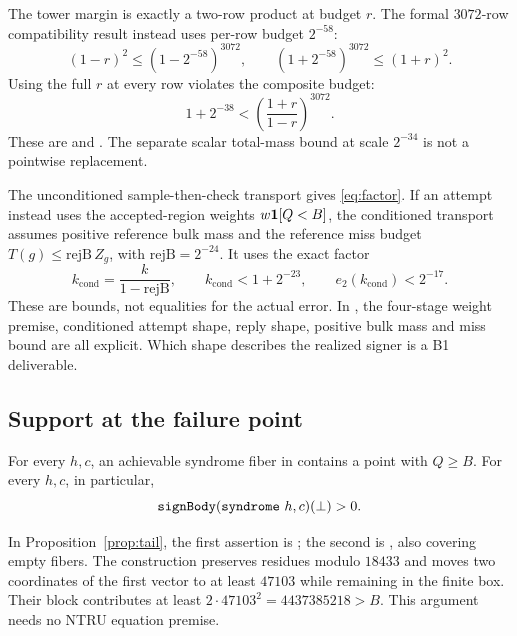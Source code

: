 The tower margin is exactly a two-row product at budget $r$. The formal
$3072$-row compatibility result instead uses per-row budget $2^{-58}$:
\[
 (1-r)^2\leq(1-2^{-58})^{3072},\qquad
 (1+2^{-58})^{3072}\leq(1+r)^2.
\]
Using the full $r$ at every row violates the composite budget:
\[
 1+2^{-38}<\left(\frac{1+r}{1-r}\right)^{3072}.
\]
These are  and
. The separate scalar total-mass bound
at scale $2^{-34}$ is not a pointwise replacement.

\begin{remark}\label{rmk:shape}
The unconditioned sample-then-check transport gives \eqref{eq:factor}.
If an attempt instead uses the accepted-region weights
$w\mathbf{1}[Q<B]$, the conditioned transport assumes positive reference
bulk mass and the reference miss budget
$T(g)\leq\mathrm{rejB}\,Z_g$, with $\mathrm{rejB}=2^{-24}$.
It uses the exact factor
\[
 k_{\mathrm{cond}}=\frac{k}{1-\mathrm{rejB}},\qquad
 k_{\mathrm{cond}}<1+2^{-23},\qquad e_2(k_{\mathrm{cond}})<2^{-17}.
\]
These are bounds, not equalities for the actual error. In
, the four-stage weight premise, conditioned
attempt shape, reply shape, positive bulk mass and miss bound are all
explicit. Which shape describes the realized signer is a B1 deliverable.
\end{remark}

\subsection{Support at the failure point}
\begin{proposition}\label{prop:tail}
For every $h,c$, an achievable syndrome fiber in 
contains a point with $Q\geq B$. For every $h,c$, in particular,
\[
 \code{signBody}(\code{syndrome}\ h,c)(\none)>0.
\]
\end{proposition}
In Proposition~\ref{prop:tail}, the first assertion is
; the second is
, also covering empty fibers. The
construction  preserves residues modulo $18433$ and
moves two coordinates of the first vector to at least $47103$ while
remaining in the finite box. Their block contributes at least
$2\cdot47103^2=4437385218>B$. This argument needs no NTRU equation
premise.

